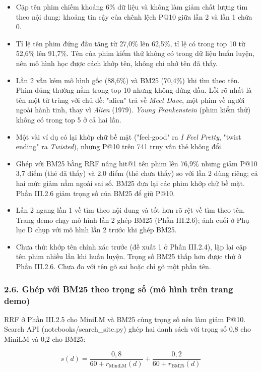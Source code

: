 \documentclass[12pt,a4paper]{article}
\providecommand{\tightlist}{\setlength{\itemsep}{0pt}\setlength{\parskip}{0pt}}
\let\oldsubsubsection\subsubsection
\renewcommand{\subsubsection}{\Needspace{10\baselineskip}\oldsubsubsection}
\begin{document}
\begin{itemize}
\tightlist
\item Cặp tên phim chiếm khoảng 6\% dữ liệu và không làm giảm chất lượng tìm theo nội dung: khoảng tin cậy của chênh lệch P@10 giữa lần 2 và lần 1 chứa 0.
\item Tỉ lệ tên phim đứng đầu tăng từ 27,0\% lên 62,5\%, tỉ lệ có trong top 10 từ 52,6\% lên 91,7\%. Tên của phim kiểm thử không có trong dữ liệu huấn luyện, nên mô hình học được cách khớp tên, không chỉ nhớ tên đã thấy.
\item Lần 2 vẫn kém mô hình gốc (88,6\%) và BM25 (70,4\%) khi tìm theo tên. Phim đúng thường nằm trong top 10 nhưng không đứng đầu. Lỗi rõ nhất là tên một từ trùng với chủ đề: "alien" trả về \emph{Meet Dave}, một phim về người ngoài hành tinh, thay vì \emph{Alien} (1979). \emph{Young Frankenstein} (phim kiểm thử) không có trong top 5 ở cả hai lần.
\item Một vài ví dụ có lại khớp chữ bề mặt ("feel-good" ra \emph{I Feel Pretty}, "twist ending" ra \emph{Twisted}), nhưng P@10 trên 741 truy vấn thẻ không đổi.
\item Ghép với BM25 bằng RRF nâng hit@1 tên phim lên 76,9\% nhưng giảm P@10 3,7 điểm (thẻ đã thấy) và 2,0 điểm (thẻ chưa thấy) so với lần 2 dùng riêng; cả hai mức giảm nằm ngoài sai số. BM25 đưa lại các phim khớp chữ bề mặt. Phần III.2.6 giảm trọng số của BM25 để giữ P@10.
\item Lần 2 ngang lần 1 về tìm theo nội dung và tốt hơn rõ rệt về tìm theo tên. Trang demo chạy mô hình lần 2 ghép BM25 (Phần III.2.6); ảnh cuối ở Phụ lục D chụp với mô hình lần 2 trước khi ghép BM25.
\item Chưa thử: khớp tên chính xác trước (đề xuất 1 ở Phần III.2.4), lặp lại cặp tên phim nhiều lần khi huấn luyện. Trọng số BM25 thấp hơn được thử ở Phần III.2.6. Chưa đo với tên gõ sai hoặc chỉ gõ một phần tên.
\end{itemize}

\subsubsection{2.6. Ghép với BM25 theo trọng số (mô hình trên trang demo)}

RRF ở Phần III.2.5 cho MiniLM và BM25 cùng trọng số nên làm giảm P@10. Search API (notebooks/search\_site.py) ghép hai danh sách với trọng số 0,8 cho MiniLM và 0,2 cho BM25:

\[
s(d)=\frac{0{,}8}{60+r_{\mathrm{MiniLM}}(d)}+\frac{0{,}2}{60+r_{\mathrm{BM25}}(d)}
\]
\end{document}
